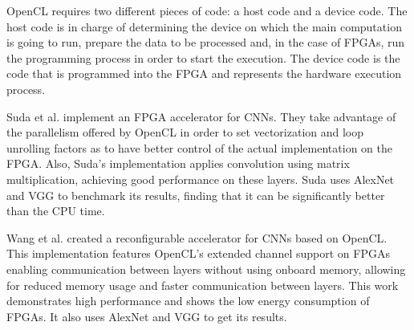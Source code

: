 OpenCL requires two different pieces of code: a host code and a device code. The
host code is in charge of determining the device on which the main computation is
going to run, prepare the data to be processed and, in the case of FPGAs, run the 
programming process in order to start the execution. The device code is the
code that is programmed into the FPGA and represents the hardware execution process.

Suda et al. \cite{suda} implement an FPGA accelerator for CNNs. They take advantage
of the parallelism offered by OpenCL in order to set vectorization and 
loop unrolling factors as to have better control of the actual implementation
on the FPGA. Also, Suda's implementation applies convolution using
matrix multiplication, achieving good performance on these layers. Suda
uses AlexNet and VGG to benchmark its results, finding that it can be
significantly better than the CPU time.

Wang et al. \cite{pipecnn} created a reconfigurable accelerator for CNNs
based on OpenCL. This implementation features OpenCL's extended channel support 
on FPGAs enabling communication between layers without using onboard memory, allowing
for reduced memory usage and faster communication between layers.
This work demonstrates high performance and shows the low energy consumption
of FPGAs. It also uses AlexNet and VGG to get its results.
